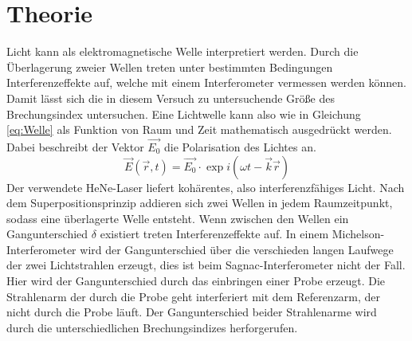 \section{Theorie}
\label{sec:Theorie}
Licht kann als elektromagnetische Welle interpretiert werden. Durch die Überlagerung
zweier Wellen treten unter bestimmten Bedingungen Interferenzeffekte auf, welche mit
einem Interferometer vermessen werden können. Damit lässt sich die in diesem Versuch
zu untersuchende Größe des Brechungsindex untersuchen.
Eine Lichtwelle kann also wie in Gleichung \ref{eq:Welle} als Funktion von Raum und Zeit
mathematisch ausgedrückt werden. Dabei beschreibt der Vektor $\vec{E_0}$ die Polarisation des Lichtes an.
\begin{equation}
	\vec{E}(\vec{r},t) = \vec{E_0}\cdot \exp i(\omega t - \vec{k}\vec{r})
\label{eq:Welle}
\end{equation}
Der verwendete HeNe-Laser liefert kohärentes, also interferenzfähiges Licht.
Nach dem Superpositionsprinzip addieren sich zwei Wellen in jedem Raumzeitpunkt,
sodass eine überlagerte Welle entsteht. Wenn zwischen den Wellen ein Gangunterschied
$\delta$ existiert treten Interferenzeffekte auf. In einem Michelson-Interferometer wird der
Gangunterschied über die verschieden langen Laufwege der zwei Lichtstrahlen erzeugt, dies ist
beim Sagnac-Interferometer nicht der Fall. Hier wird der Gangunterschied durch das einbringen 
einer Probe erzeugt. Die Strahlenarm der durch die Probe geht interferiert mit dem Referenzarm, 
der nicht durch die Probe läuft. Der Gangunterschied beider Strahlenarme wird durch die 
unterschiedlichen Brechungsindizes herforgerufen.
